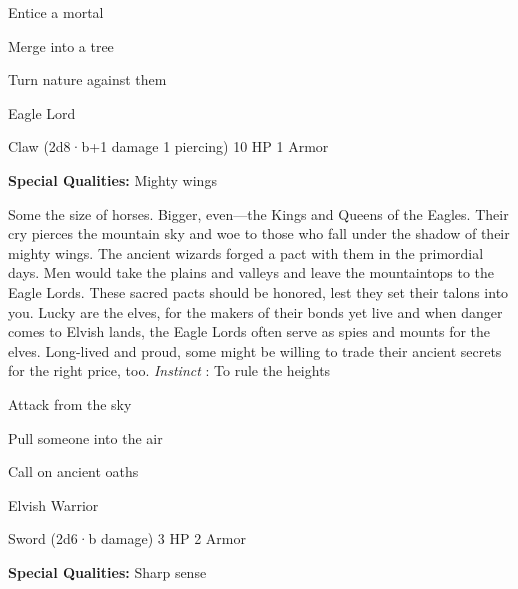 \startitemize[1,packed]

\item Entice a mortal

 
\item Merge into a tree

 
\item Turn nature against them


\stopitemize
 
\startMonsterName
Eagle Lord	 
\stopMonsterName
 

Claw (2d8·b+1 damage 1 piercing)	10 HP	1 Armor

 


 
\startMonsterQualities
{\bf Special Qualities:}  Mighty wings
\stopMonsterQualities
 
\startMonsterDescription
Some the size of horses. Bigger, even—the Kings and Queens of the Eagles. Their cry pierces the mountain sky and woe to those who fall under the shadow of their mighty wings. The ancient wizards forged a pact with them in the primordial days. Men would take the plains and valleys and leave the mountaintops to the Eagle Lords. These sacred pacts should be honored, lest they set their talons into you. Lucky are the elves, for the makers of their bonds yet live and when danger comes to Elvish lands, the Eagle Lords often serve as spies and mounts for the elves. Long-lived and proud, some might be willing to trade their ancient secrets for the right price, too. {\em Instinct} : To rule the heights
\stopMonsterDescription
 
\startitemize[1,packed]

\item Attack from the sky

 
\item Pull someone into the air

 
\item Call on ancient oaths


\stopitemize
 
\startMonsterName
Elvish Warrior	 
\stopMonsterName
 

Sword (2d6·b damage)	3 HP	2 Armor

 


 
\startMonsterQualities
{\bf Special Qualities:}  Sharp sense
\stopMonsterQualities
 
